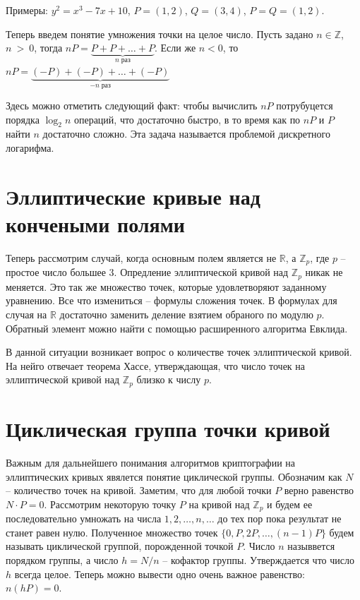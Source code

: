 \documentclass[a4paper,12pt]{article}
\begin{document}
        Примеры: $y^2 = x^3 - 7x + 10$, $P = (1, 2)$, $Q = (3, 4)$, $P = Q = (1, 2)$.

        Теперь введем понятие умножения точки на целое число. Пусть задано $n \in \mathbb{Z}$, $n~>~0$, тогда $nP = \underbrace{P + P + \dots + P}_{n\;\text{раз}}$. 
        Если же $n < 0$, то $nP = \underbrace{(-P) + (-P) + \dots + (-P)}_{-n \; \text{раз}}$

        Здесь можно отметить следующий факт: чтобы вычислить $nP$ потрубуцется порядка $\log_2{n}$ операций, что достаточно быстро, в
        то время как по $nP$ и $P$ найти $n$ достаточно сложно. Эта задача называется проблемой дискретного логарифма.

    \section{Эллиптические кривые над кончеными полями}
        Теперь рассмотрим случай, когда основным полем является не $\mathbb{R}$, а $\mathbb{Z}_p$, где $p$ -- простое 
        число большее 3. Опредление эллиптической кривой над $\mathbb{Z}_p$ никак не меняется. Это так же множество точек, которые удовлетворяют
        заданному уравнению. Все что измениться -- формулы сложения точек. В формулах для случая на $\mathbb{R}$ достаточно заменить деление взятием обраного по
        модулю $p$. Обратный элемент можно найти с помощью расширенного алгоритма Евклида. 
        
        В данной ситуации возникает вопрос о количестве точек эллиптической кривой. На нейго отвечает теорема Хассе, утверждающая, что число точек на эллиптической кривой над 
        $\mathbb{Z}_p$ близко к числу $p$.

    \section{Циклическая группа точки кривой}
        Важным для дальнейшего понимания алгоритмов криптографии на эллиптических кривых явялется понятие циклической группы. Обозначим как $N$ -- количество точек на кривой.
        Заметим, что для любой точки $P$ верно равенство $N \cdot P = 0$.
        Рассмотрим некоторую точку $P$ на кривой над $\mathbb{Z}_p$ и будем ее 
        последовательно умножать на числа $1, 2, \dots, n, \dots$ до тех пор пока результат не станет равен нулю. 
        Полученное множество точек $\{0, P, 2P, \dots, (n-1)P\}$ будем называть  циклической группой, порожденной точкой $P$. 
        Число $n$ назыввется порядком группы, а число $h = N / n$ -- кофактор группы. Утверждается что число $h$ всегда целое. Теперь можно
        вывести одно очень важное равенство: $n(hP) = 0$. 
\end{document}
